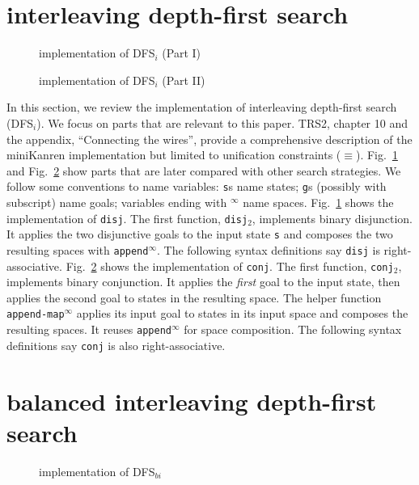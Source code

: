 \documentclass[format=acmlarge, review=false, authordraft=false]{acmart}
\newcommand{\conj}{\texttt{conj}}
\newcommand{\disj}{\texttt{disj}}
\newcommand{\disjtwo}{\texttt{disj$_2$}}
\newcommand{\conjtwo}{\texttt{conj$_2$}}
\newcommand{\appendInf}{\texttt{append$^\infty$}}
\newcommand{\appendMapInf}{\texttt{append-map$^\infty$}}
\newcommand{\DFSi }[0]{DFS$_{i}$}
\newcommand{\DFSbi}[0]{DFS$_{bi}$}
\begin{document}
\section{interleaving depth-first search}

\begin{figure}
	
	\caption{implementation of \DFSi{} (Part I)}
	\label{DFSi-0}
\end{figure}

\begin{figure}
	
	\caption{implementation of \DFSi{} (Part II)}
	\label{DFSi-1}
\end{figure}

In this section, we review the implementation of interleaving depth-first 
search (\DFSi). We focus on parts that are relevant to this paper. TRS2,
chapter 10 and the appendix, ``Connecting the wires'', 
provide a comprehensive description of the miniKanren 
implementation but limited to unification constraints ($\equiv$).
Fig.~\ref{DFSi-0} and Fig.~\ref{DFSi-1} show parts that are later compared 
with other search strategies. We follow some conventions to name variables: 
\texttt{s}s name states; \texttt{g}s (possibly with subscript) name goals; 
variables ending with $^\infty$ name spaces. Fig.~\ref{DFSi-0} shows 
the 
implementation of \disj. The 
first function, \disjtwo, implements binary disjunction. It applies the 
two disjunctive goals to the input state \texttt{s} and composes the two 
resulting spaces with \appendInf{}. The following syntax 
definitions say \disj{} is right-associative. Fig.~\ref{DFSi-1} 
shows the implementation of \conj. The first function, \conjtwo{}, 
implements binary conjunction. 
It applies the \emph{first} goal to the input state, then applies the second 
goal to states in the resulting space. The helper function 
\appendMapInf{} applies its input goal to states 
in its input space and composes the resulting spaces. It reuses 
\appendInf{} for space composition. The following syntax 
definitions say \conj{} is also right-associative.

\section{balanced interleaving depth-first search}

\begin{figure}
	
	\caption{implementation of \DFSbi{}}
	\label{balanced-disj}
\end{figure}
\end{document}
